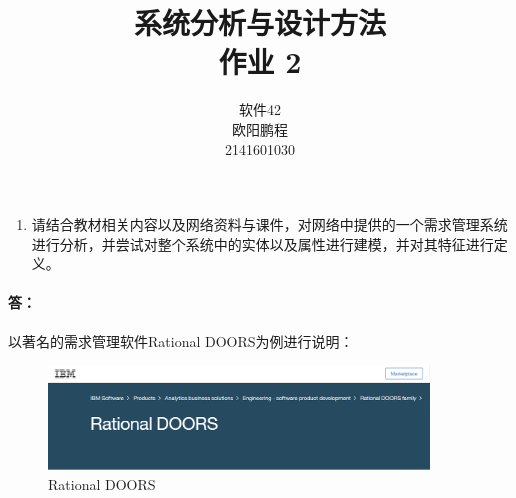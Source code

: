 \documentclass[UTF8]{ctexart}
\title{系统分析与设计方法 \\ 作业 2}
\author{软件42 \\ 欧阳鹏程 \\ 2141601030}
\begin{document}
\maketitle

\begin{enumerate}
	\item
	请结合教材相关内容以及网络资料与课件，对网络中提供的一个需求管理系统进行分析，并尝试对整个系统中的实体以及属性进行建模，并对其特征进行定义。
\end{enumerate}
	\paragraph{答：} 以著名的需求管理软件Rational DOORS为例进行说明：
		\begin{figure}[H]
		\centering
		\includegraphics[width=0.9\textwidth]{1.png}
		\caption{Rational DOORS}
	\end{figure}
\end{document}
